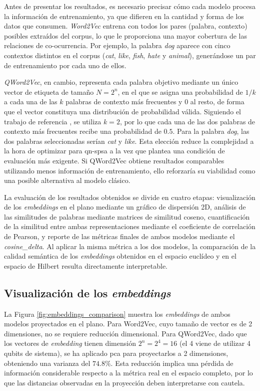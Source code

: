 Antes de presentar los resultados, es necesario precisar cómo cada modelo procesa la información de entrenamiento, ya que difieren en la cantidad y forma de los datos que consumen. \textit{Word2Vec} entrena con todos los pares (palabra, contexto) posibles extraídos del corpus, lo que le proporciona una mayor cobertura de las relaciones de co-ocurrencia. Por ejemplo, la palabra \textit{dog} aparece con cinco contextos distintos en el corpus (\textit{cat}, \textit{like}, \textit{fish}, \textit{hate} y \textit{animal}), generándose un par de entrenamiento por cada uno de ellos.

\textit{QWord2Vec}, en cambio, representa cada palabra objetivo mediante un único vector de etiqueta de tamaño $N = 2^n$, en el que se asigna una probabilidad de $1/k$ a cada una de las $k$ palabras de contexto más frecuentes y $0$ al resto, de forma que el vector constituya una distribución de probabilidad válida. Siguiendo el trabajo de referencia \cite{ohno_qword2vec_2025}, se utiliza $k = 2$, por lo que cada una de las dos palabras de contexto más frecuentes recibe una probabilidad de $0.5$. Para la palabra \textit{dog}, las dos palabras seleccionadas serían \textit{cat} y \textit{like}. Esta elección reduce la complejidad a la hora de optimizar para \gls{qn-spsa} a la vez que plantea una condición de evaluación más exigente. Si QWord2Vec obtiene resultados comparables utilizando menos información de entrenamiento, ello reforzaría su viabilidad como una posible alternativa al modelo clásico.

La evaluación de los resultados obtenidos se divide en cuatro etapas: visualización de los \textit{embeddings} en el plano mediante un gráfico de dispersión 2D, análisis de las similitudes de palabras mediante matrices de similitud coseno, cuantificación de la similitud entre ambas representaciones mediante el coeficiente de correlación de Pearson, y reporte de las métricas finales de ambos modelos mediante el \textit{cosine\_delta}. Al aplicar la misma métrica a los dos modelos, la comparación de la calidad semántica de los \textit{embeddings} obtenidos en el espacio euclídeo y en el espacio de Hilbert resulta directamente interpretable.

\subsection{Visualización de los \textit{embeddings}}

La Figura \ref{fig:embeddings_comparison} muestra los \textit{embeddings} de ambos modelos proyectados en el plano. Para Word2Vec, cuyo tamaño de vector es de 2 dimensiones, no se requiere reducción dimensional. Para QWord2Vec, dado que los vectores de \textit{embedding} tienen dimensión $2^n = 2^4 = 16$ (el 4 viene de utilizar 4 qubits de sistema), se ha aplicado \gls{pca} para proyectarlos a 2 dimensiones, obteniendo una varianza del $74.8\%$. Esta reducción implica una pérdida de información considerable respecto a la métrica real en el espacio completo, por lo que las distancias observadas en la proyección deben interpretarse con cautela.

